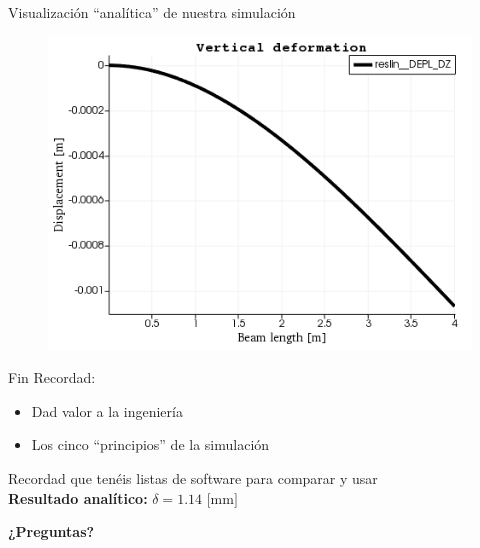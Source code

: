\documentclass[12pt]{beamer}
\begin{document}
\begin{frame}{Visualización ``analítica'' de nuestra simulación}
	\begin{figure}
		\centering
		\hspace*{-1em}\includegraphics[width=1\linewidth]{postprodefline}
		\label{fig:lineresult}
	\end{figure}
\end{frame}

\begin{frame}{Fin}
	Recordad:
	\begin{itemize}
		\item Dad valor a la ingeniería
		\item Los cinco ``principios'' de la simulación
	\end{itemize}
	Recordad que tenéis listas de software para comparar y usar \\
	
	\textbf{Resultado analítico:} $\delta = 1.14\text{ [mm]}$
	
	\vfill
	\begin{center}
		\LARGE \textbf{¿Preguntas?}
	\end{center}
\end{frame}
\end{document}
